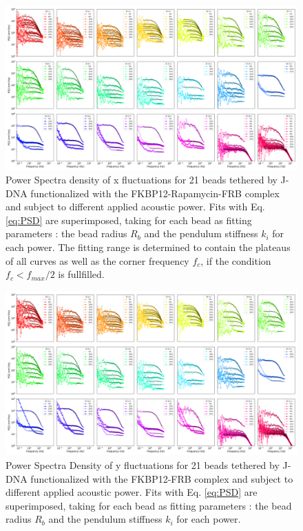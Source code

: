 \documentclass{biophys-new}
\begin{document}
\begin{figure}
	\centering
	\centerline {\includegraphics[width=1\linewidth]{Figures/multispectrumx_Rapa.png}}
	\caption{Power Spectra density of x fluctuations for 21 beads tethered by J-DNA functionalized with the FKBP12-Rapamycin-FRB complex and subject to different applied acoustic power. Fits with Eq. \ref{eq:PSD} are superimposed, taking for each bead as fitting parameters : the bead radius $R_b$ and the pendulum stiffness $k_i$ for each power. The fitting range is determined to contain the plateaus of all curves as well as the corner frequency $f_c$, if the condition $f_c < f_{max}/2$ is fullfilled.}
	\label{fig:FitSpectra}
\end{figure}

\begin{figure}
	\centering
	\centerline {\includegraphics[width=1\linewidth]{Figures/multispectrumy_Rapa.png}}
	\caption{Power Spectra Density of y fluctuations for 21 beads tethered by J-DNA functionalized with the FKBP12-FRB complex and subject to different applied acoustic power. Fits with Eq. \ref{eq:PSD} are superimposed, taking for each bead as fitting parameters : the bead radius $R_b$ and the pendulum stiffness $k_i$ for each power.}
	\label{fig:FitSpectra_y}
\end{figure}
\end{document}
